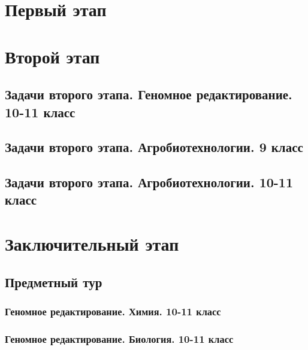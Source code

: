 \documentclass[a4paper,12pt,oneside]{book}
\begin{document}

\setcounter{tocdepth}{1}

\tableofcontents

\part{Первый этап}
\clearpage




\part{Второй этап}
\clearpage 
\chapter{Задачи второго этапа. Геномное редактирование. 10-11 класс}



\chapter{Задачи второго этапа. Агробиотехнологии. 9 класс}


\chapter{Задачи второго этапа. Агробиотехнологии. 10-11 класс}


\part{Заключительный этап}

\clearpage
\chapter{Предметный тур}

\section{Геномное редактирование. Химия. 10-11 класс}


\section{Геномное редактирование. Биология. 10-11 класс}

\end{document}
